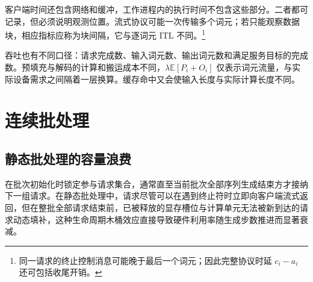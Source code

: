 \documentclass[../textbook.tex]{subfiles}
\begin{document}
客户端时间还包含网络和缓冲，工作进程内的执行时间不包含这些部分。二者都可记录，但必须说明观测位置。流式协议可能一次传输多个词元；若只能观察数据块，相应指标应称为块间隔，它与逐词元 ITL 不同。\footnote{同一请求的终止控制消息可能晚于最后一个词元；因此完整协议时延 $c_i-a_i$ 还可包括收尾开销。}

吞吐也有不同口径：请求完成数、输入词元数、输出词元数和满足服务目标的完成数。预填充与解码的计算和搬运成本不同，$\lambda\mathbb E[P_i+O_i]$ 仅表示词元流量，与实际设备需求之间隔着一层换算。缓存命中又会使输入长度与实际计算长度不同。

\section{连续批处理}

\subsection{静态批处理的容量浪费}
在批次初始化时锁定参与请求集合，通常直至当前批次全部序列生成结束方才接纳下一组请求。在静态批处理中，请求尽管可以在遇到终止符时立即向客户端流式返回，但在整批全部请求结束前，已被释放的显存槽位与计算单元无法被新到达的请求动态填补，这种生命周期木桶效应直接导致硬件利用率随生成步数推进而显著衰减。
\end{document}
